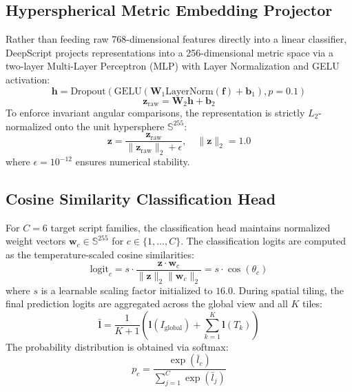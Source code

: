 \documentclass[conference,10pt]{IEEEtran}
\begin{document}
\subsection{Hyperspherical Metric Embedding Projector}
Rather than feeding raw 768-dimensional features directly into a linear classifier, DeepScript projects representations into a 256-dimensional metric space via a two-layer Multi-Layer Perceptron (MLP) with Layer Normalization and GELU activation:
\begin{equation}
\mathbf{h} = \text{Dropout}\left(\text{GELU}\left(\mathbf{W}_1 \text{LayerNorm}(\mathbf{f}) + \mathbf{b}_1\right), p = 0.1\right)
\end{equation}
\begin{equation}
\mathbf{z}_{\text{raw}} = \mathbf{W}_2 \mathbf{h} + \mathbf{b}_2
\end{equation}
To enforce invariant angular comparisons, the representation is strictly $L_2$-normalized onto the unit hypersphere $\mathbb{S}^{255}$:
\begin{equation}
\mathbf{z} = \frac{\mathbf{z}_{\text{raw}}}{\|\mathbf{z}_{\text{raw}}\|_2 + \epsilon}, \quad \|\mathbf{z}\|_2 = 1.0
\end{equation}
where $\epsilon = 10^{-12}$ ensures numerical stability.

\subsection{Cosine Similarity Classification Head}
For $C = 6$ target script families, the classification head maintains normalized weight vectors $\mathbf{w}_c \in \mathbb{S}^{255}$ for $c \in \{1, \dots, C\}$. The classification logits are computed as the temperature-scaled cosine similarities:
\begin{equation}
\text{logit}_c = s \cdot \frac{\mathbf{z} \cdot \mathbf{w}_c}{\|\mathbf{z}\|_2 \|\mathbf{w}_c\|_2} = s \cdot \cos(\theta_{c})
\end{equation}
where $s$ is a learnable scaling factor initialized to $16.0$. During spatial tiling, the final prediction logits are aggregated across the global view and all $K$ tiles:
\begin{equation}
\bar{\mathbf{l}} = \frac{1}{K + 1} \left( \mathbf{l}(I_{\text{global}}) + \sum_{k=1}^K \mathbf{l}(T_k) \right)
\end{equation}
The probability distribution is obtained via softmax:
\begin{equation}
p_c = \frac{\exp(\bar{l}_c)}{\sum_{j=1}^C \exp(\bar{l}_j)}
\end{equation}
\end{document}
